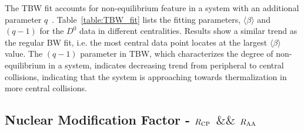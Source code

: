 \documentclass[%
 reprint,	
 amsmath,amssymb,
 aps,
 prc,
]{revtex4-1}
\begin{document}
The TBW fit accounts for non-equilibrium feature in a system with an additional parameter $q$~\cite{Tang:2008ud}. Table~\ref{table:TBW_fit} lists the fitting parameters, $\langle\beta\rangle$ and $(q-1)$ for the $D^0$ data in different centralities. Results show a similar trend as the regular BW fit, i.e. the most central data point locates at the largest $\langle\beta\rangle$ value. The $(q-1)$ parameter in TBW, which characterizes the degree of non-equilibrium in a system, indicates decreasing trend from peripheral to central collisions, indicating that the system is approaching towards thermalization in more central collisions.

\begin{table}[t]
\end{table}

\subsection{\label{result:RCP}Nuclear Modification Factor - $R_{\rm CP}$ $\&\&$  $R_{\rm AA}$}
\end{document}
